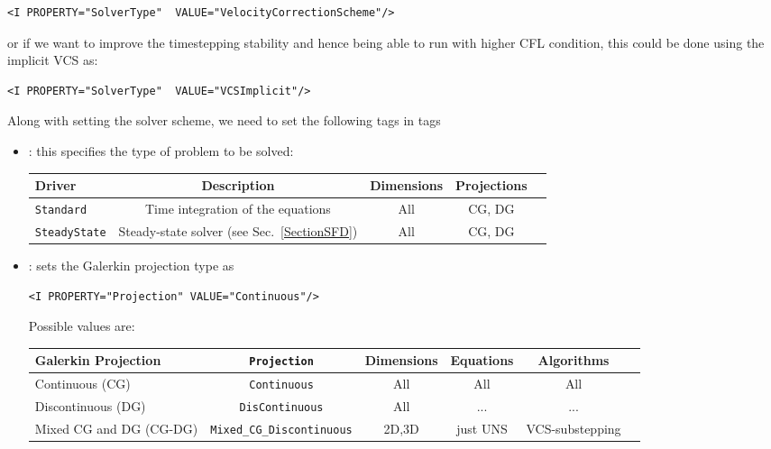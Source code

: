 \begin{lstlisting}[style=XMLStyle]
<I PROPERTY="SolverType"  VALUE="VelocityCorrectionScheme"/>
\end{lstlisting}

or if we want to improve the timestepping stability and hence being able to 
run with higher CFL condition, this could be done using the implicit VCS as:

\begin{lstlisting}[style=XMLStyle]
<I PROPERTY="SolverType"  VALUE="VCSImplicit"/>
\end{lstlisting}

Along with setting the solver scheme, we need to set the following tags in 
 tags


\begin{itemize}
\item {}: this specifies the type of problem to be solved:

\begin{center}
\footnotesize
\begin{tabular}{lcccc}
\toprule
{Driver} & {Description} &{Dimensions}&{Projections} \\
\midrule
\texttt{Standard} & Time integration of the equations & All & CG, DG \\
\texttt{SteadyState} & Steady-state solver (see Sec.~\ref{SectionSFD})  & All & CG, DG \\
\bottomrule
\end{tabular}
\end{center}

\item {}: sets the Galerkin projection type as
\begin{lstlisting}[style=XMLStyle]
<I PROPERTY="Projection" VALUE="Continuous"/>
\end{lstlisting}

Possible values are:
\begin{center}
\footnotesize
\begin{tabular}{lccccc}
\toprule
{Galerkin Projection} & \texttt{Projection} &{Dimensions}&{Equations}&{Algorithms} \\
\midrule
Continuous (CG)&  \texttt{Continuous} & All & All & All \\
Discontinuous (DG) & \texttt{DisContinuous} & All &...&...\\
Mixed CG and DG (CG-DG) & \texttt{Mixed\_CG\_Discontinuous} & 2D,3D & just UNS & VCS-substepping \\
\bottomrule
\end{tabular}
\end{center}

\end{itemize}

